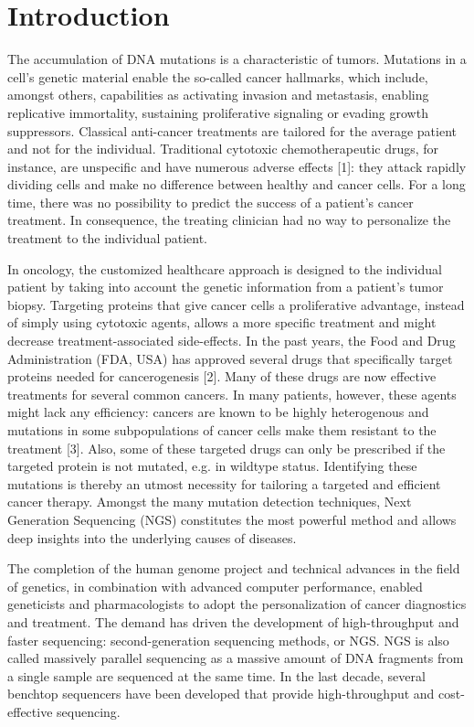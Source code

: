 \section{Introduction}

The accumulation of DNA mutations is a characteristic of tumors. Mutations in a
cell’s genetic material enable the so-called cancer hallmarks, which include,
amongst others, capabilities as activating invasion and metastasis, enabling
replicative immortality, sustaining proliferative signaling or evading growth
suppressors. Classical anti-cancer treatments are tailored for the \„average
patient\“ and not for the individual. Traditional cytotoxic chemotherapeutic
drugs, for instance, are unspecific and have numerous adverse effects [1]: they
attack rapidly dividing cells and make no difference between healthy and cancer
cells. For a long time, there was no possibility to predict the success of a
patient’s cancer treatment. In consequence, the treating clinician had no way to
personalize the treatment to the individual patient.

In oncology, the customized healthcare approach is designed to the individual
patient by taking into account the genetic information from a patient’s tumor
biopsy. Targeting proteins that give cancer cells a proliferative advantage,
instead of simply using cytotoxic agents, allows a more specific treatment and
might decrease treatment-associated side-effects. In the past years, the Food
and Drug Administration (FDA, USA) has approved several drugs that specifically
target proteins needed for cancerogenesis [2]. Many of these drugs are now
effective treatments for several common cancers. In many patients, however,
these agents might lack any efficiency: cancers are known to be highly
heterogenous and mutations in some subpopulations of cancer cells make them
resistant to the treatment [3]. Also, some of these targeted drugs can only be
prescribed if the targeted protein is not mutated, e.g. in wildtype status.
Identifying these mutations is thereby an utmost necessity for tailoring a
targeted and efficient cancer therapy. Amongst the many mutation detection
techniques, Next Generation Sequencing (NGS) constitutes the most powerful
method and allows deep insights into the underlying causes of diseases.

The completion of the human genome project and technical advances in the field
of genetics, in combination with advanced computer performance, enabled
geneticists and pharmacologists to adopt the personalization of cancer
diagnostics and treatment. The demand has driven the development of
high-throughput and faster sequencing: second-generation sequencing methods, or
NGS. NGS is also called massively parallel sequencing
as a massive amount of DNA fragments from a single sample are sequenced at the
same time. In the last decade, several benchtop sequencers have been developed
that provide high-throughput and cost-effective sequencing.

